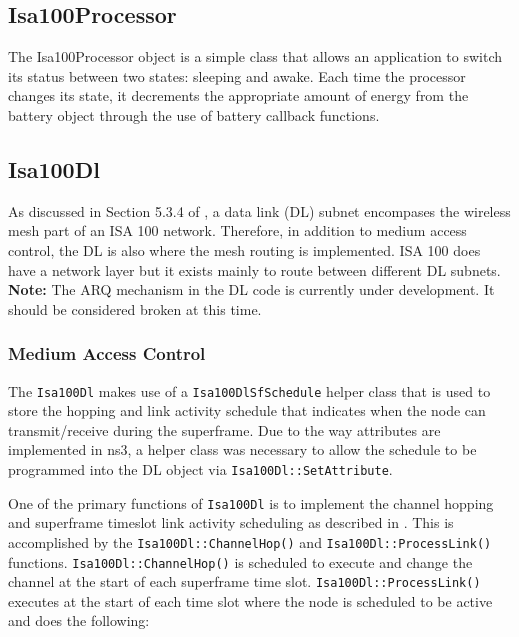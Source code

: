 \documentclass[12pt,letterpaper]{article}
\begin{document}
\subsection{Isa100Processor}

The Isa100Processor object is a simple class that allows an application to switch its status between two states: sleeping and awake.  Each time the processor changes its state, it decrements the appropriate amount of energy from the battery object through the use of battery callback functions.



\subsection{Isa100Dl}

As discussed in Section 5.3.4 of \cite{isa100.11a}, a data link (DL) subnet encompases the wireless mesh part of an ISA 100 network.  Therefore, in addition to medium access control, the DL is also where the mesh routing is implemented.  ISA 100 does have a network layer but it exists mainly to route between different DL subnets.\\[0.5cm]

\noindent
{\bf Note:} The ARQ mechanism in the DL code is currently under development.  It should be considered broken at this time.


\subsubsection{Medium Access Control}

The {\tt Isa100Dl} makes use of a {\tt Isa100DlSfSchedule} helper class that is used to store the hopping and link activity schedule that indicates when the node can transmit/receive during the superframe.  Due to the way attributes are implemented in ns3, a helper class was necessary to allow the schedule to be programmed into the DL object via {\tt Isa100Dl::SetAttribute}.

One of the primary functions of {\tt Isa100Dl} is to implement the channel hopping and superframe timeslot link activity scheduling as described in \cite{isa100.11a}.  This is accomplished by the {\tt Isa100Dl::ChannelHop()} and {\tt Isa100Dl::ProcessLink()} functions. {\tt Isa100Dl::ChannelHop()} is scheduled to execute and change the channel at the start of each superframe time slot.  {\tt Isa100Dl::ProcessLink()} executes at the start of each time slot where the node is scheduled to be active and does the following:
\end{document}

